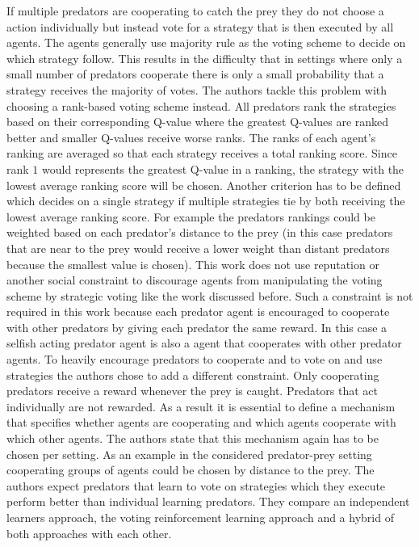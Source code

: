 \documentclass[conference]{IEEEtran}
\begin{document}
\newline
If multiple predators are cooperating to catch the prey they do not choose a action individually but instead vote for a strategy that is then executed by all agents. The agents generally use majority rule as the voting scheme to decide on which strategy follow. This results in the difficulty that in settings where only a small number of predators cooperate there is only a small probability that a strategy receives the majority of votes. The authors tackle this problem with choosing a rank-based voting scheme instead. All predators rank the strategies based on their corresponding Q-value where the greatest Q-values are ranked better and smaller Q-values receive worse ranks. The ranks of each agent's ranking are averaged so that each strategy receives a total ranking score. Since rank $1$ would represents the greatest Q-value in a ranking, the strategy with the lowest average ranking score will be chosen. Another criterion has to be defined which decides on a single strategy if multiple strategies tie by both receiving the lowest average ranking score. For example the predators rankings could be weighted based on each predator's distance to the prey (in this case predators that are near to the prey would receive a lower weight than distant predators because the smallest value is chosen).
\newline
This work does not use reputation or another social constraint to discourage agents from manipulating the voting scheme by strategic voting like the work discussed before. Such a constraint is not required in this work because each predator agent is encouraged to cooperate with other predators by giving each predator the same reward. In this case a selfish acting predator agent is also a agent that cooperates with other predator agents. To heavily encourage predators to cooperate and to vote on and use strategies the authors chose to add a different constraint. Only cooperating predators receive a reward whenever the prey is caught. Predators that act individually are not rewarded.
\newline
As a result it is essential to define a mechanism that specifies whether agents are cooperating and which agents cooperate with which other agents. The authors state that this mechanism again has to be chosen per setting. As an example in the considered predator-prey setting cooperating groups of agents could be chosen by distance to the prey.
\newline
The authors expect predators that learn to vote on strategies which they execute perform better than individual learning predators. They compare an independent learners approach, the voting reinforcement learning approach and a hybrid of both approaches with each other.
\end{document}
